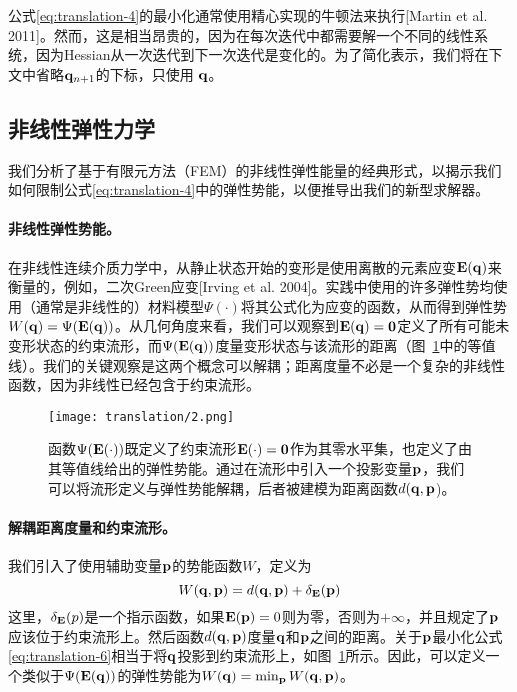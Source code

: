 \begin{translation}
公式\eqref{eq:translation-4}的最小化通常使用精心实现的牛顿法来执行[Martin et al. 2011]。然而，这是相当昂贵的，因为在每次迭代中都需要解一个不同的线性系统，因为Hessian从一次迭代到下一次迭代是变化的。为了简化表示，我们将在下文中省略$\vb{q}_{n + 1}$的下标，只使用 $\vb{q}$。

\subsection{非线性弹性力学}

我们分析了基于有限元方法（FEM）的非线性弹性能量的经典形式，以揭示我们如何限制公式\eqref{eq:translation-4}中的弹性势能，以便推导出我们的新型求解器。

\paragraph{非线性弹性势能。}

在非线性连续介质力学中，从静止状态开始的变形是使用离散的元素应变$\vb{E}(\vb{q})$来衡量的，例如，二次Green应变[Irving et al. 2004]。实践中使用的许多弹性势均使用（通常是非线性的）材料模型$\Psi(\cdot)$将其公式化为应变的函数，从而得到弹性势$W(\vb{q}) = \Psi(\vb{E}(\vb{q}))$。从几何角度来看，我们可以观察到$\vb{E}(\vb{q}) = \vb{0}$定义了所有可能未变形状态的约束流形，而$\Psi(\vb{E}(\vb{q}))$度量变形状态与该流形的距离（图~\ref{fig:translation-2}中的等值线）。我们的关键观察是这两个概念可以解耦；距离度量不必是一个复杂的非线性函数，因为非线性已经包含于约束流形。

\begin{figure}
  \centering
  \texttt{[image: translation/2.png]}
  \caption{
    函数$\Psi(\vb{E}(\cdot))$既定义了约束流形$\vb{E}(\cdot) = \vb{0}$作为其零水平集，也定义了由其等值线给出的弹性势能。通过在流形中引入一个投影变量$\vb{p}$，我们可以将流形定义与弹性势能解耦，后者被建模为距离函数$d(\vb{q}, \vb{p}$)。
  }
  \label{fig:translation-2}
\end{figure}

\paragraph{解耦距离度量和约束流形。}

我们引入了使用辅助变量$\vb{p}$的势能函数$W$，定义为
\begin{equation}
  W(\vb{q}, \vb{p}) = d(\vb{q}, \vb{p}) + \delta_{\vb{E}}(\vb{p})
  \label{eq:translation-6}
\end{equation}
这里，$\delta_{\vb{E}}(p)$是一个指示函数，如果$\vb{E}(\vb{p}) = 0$则为零，否则为$+\infty$，并且规定了$\vb{p}$应该位于约束流形上。然后函数$d(\vb{q}, \vb{p})$度量$\vb{q}$和$\vb{p}$之间的距离。关于$\vb{p}$最小化公式\eqref{eq:translation-6}相当于将$\vb{q}$投影到约束流形上，如图~\ref{fig:translation-2}所示。因此，可以定义一个类似于$\Psi(\vb{E}(\vb{q}))$的弹性势能为$W(\vb{q}) = \min_{\vb{p}} W(\vb{q}, \vb{p})$。


\end{translation}

